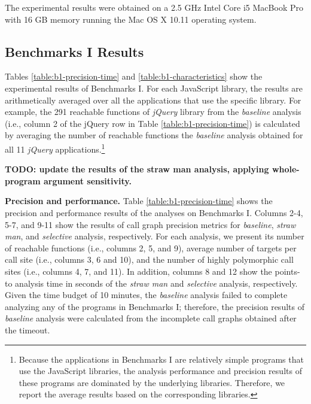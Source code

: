 The experimental results were obtained on a 2.5 GHz Intel Core i5 MacBook Pro with 16 GB memory running the Mac OS X 10.11 operating system.


\subsection{Benchmarks I Results}
\label{b1-res}

Tables \ref{table:b1-precision-time} and \ref{table:b1-characteristics} show the experimental results of Benchmarks I. For each JavaScript library, the results are arithmetically averaged over all the applications that use the specific library. For example, the 291 reachable functions of {\it jQuery} library from the {\it baseline} analysis (i.e., column 2 of the jQuery row in Table \ref{table:b1-precision-time}) is calculated by averaging the number of reachable functions the {\it baseline} analysis obtained for all 11 {\it jQuery} applications.\footnote{Because the applications in Benchmarks I are relatively simple programs that use the JavaScript libraries, the analysis performance and precision results of these programs are dominated by the underlying libraries. Therefore, we report the average results based on the corresponding libraries.} 

{\bf TODO: update the results of the straw man analysis, applying whole-program argument sensitivity.}

{\bf Precision and performance.} Table \ref{table:b1-precision-time} shows the precision and performance results of the analyses on Benchmarks I. Columns 2-4, 5-7, and 9-11 show the results of call graph precision metrics for {\it baseline}, {\it straw man}, and {\it selective} analysis, respectively. For each analysis, we present its number of reachable functions (i.e., columns 2, 5, and 9), average number of targets per call site (i.e., columns 3, 6 and 10), and the number of highly polymorphic call sites (i.e., columns 4, 7, and 11). In addition, columns 8 and 12 show the points-to analysis time in seconds of the {\it straw man} and {\it selective} analysis, respectively. Given the time budget of 10 minutes, the {\it baseline} analysis failed to complete analyzing any of the programs in Benchmarks I; therefore, the precision results of {\it baseline} analysis were calculated from the incomplete call graphs obtained after the timeout.

